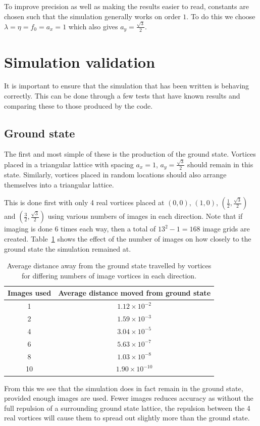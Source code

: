 \documentclass{article}
\numberwithin{equation}{section}
\begin{document}
To improve precision as well as making the results easier to read, constants are chosen such that the simulation generally works on order $1$. To do this we choose $\lambda = \eta = f_0 = a_x = 1$ which also gives $a_y = \frac{\sqrt{3}}{2}$.

\section{Simulation validation}
It is important to ensure that the simulation that has been written is behaving correctly. This can be done through a few tests that have known results and comparing these to those produced by the code.
\subsection{Ground state}
The first and most simple of these is the production of the ground state. Vortices placed in a triangular lattice with spacing $a_x=1$, $a_y=\frac{\sqrt{3}}{2}$ should remain in this state. Similarly, vortices placed in random locations should also arrange themselves into a triangular lattice.

This is done first with only 4 real vortices placed at $(0, 0)$, $(1, 0)$, $(\frac{1}{2}, \frac{\sqrt{3}}{2})$ and $(\frac{3}{2}, \frac{\sqrt{3}}{2})$ using various numbers of images in each direction. Note that if imaging is done 6 times each way, then a total of $13^2-1=168$ image grids are created. Table~\ref{tab:dist_from_images} shows the effect of the number of images on how closely to the ground state the simulation remained at.
\begin{table}[htb]
    \centering
    \begin{tabular}{c|c}
        Images used & Average distance moved from ground state \\
        \hline
        1 & $1.12\times 10^{-2}$ \\
        2 & $1.59\times 10^{-3}$ \\
        4 & $3.04\times 10^{-5}$ \\
        6 & $5.63\times 10^{-7}$ \\
        8 & $1.03\times 10^{-8}$ \\
        10 & $1.90\times 10^{-10}$ \\
    \end{tabular}
    \caption{Average distance away from the ground state travelled by vortices for differing numbers of image vortices in each direction.}
    \label{tab:dist_from_images}
\end{table}
From this we see that the simulation does in fact remain in the ground state, provided enough images are used. Fewer images reduces accuracy as without the full repulsion of a surrounding ground state lattice, the repulsion between the 4 real vortices will cause them to spread out slightly more than the ground state.
\end{document}
